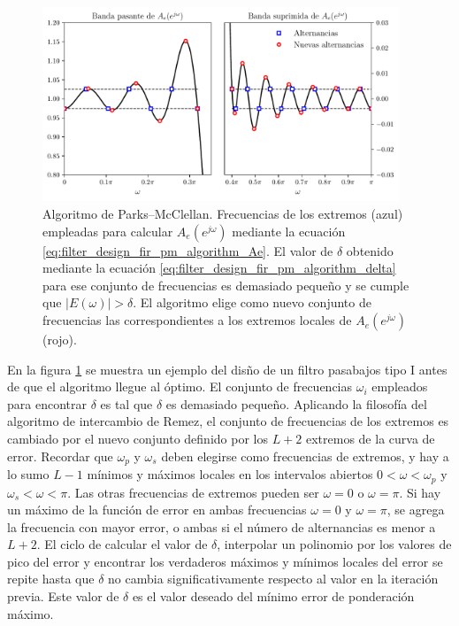 \documentclass[a4paper]{report}
\begin{document}
\begin{figure}[!htb]
 \begin{center}
 \includegraphics[width=0.95\textwidth]{figuras/filter_design_fir_optimal_pm_implementation_plots_Ae_iter_2.pdf}
 \caption{\label{fig:filter_design_fir_optimal_pm_implementation_plots_Ae_iter_2} Algoritmo de Parks--McClellan. Frecuencias de los extremos (azul) empleadas para calcular \(A_e(e^{j\omega})\) mediante la ecuación \ref{eq:filter_design_fir_pm_algorithm_Ae}. El valor de \(\delta\) obtenido mediante la ecuación \ref{eq:filter_design_fir_pm_algorithm_delta} para ese conjunto de frecuencias es demasiado pequeño y se cumple que \(|E(\omega)|>\delta\). El algoritmo elige como nuevo conjunto de frecuencias las correspondientes a los extremos locales de \(A_e(e^{j\omega})\) (rojo).}
 \end{center}
\end{figure}
En la figura \ref{fig:filter_design_fir_optimal_pm_implementation_plots_Ae_iter_2} se muestra un ejemplo del disño de un filtro pasabajos tipo I antes de que el algoritmo llegue al óptimo. El conjunto de frecuencias \(\omega_i\) empleados para encontrar \(\delta\) es tal que \(\delta\) es demasiado pequeño. Aplicando la filosofía del algoritmo de intercambio de Remez, el conjunto de frecuencias de los extremos es cambiado por el nuevo conjunto definido por los \(L+2\) extremos de la curva de error. Recordar que \(\omega_p\) y \(\omega_s\) deben elegirse como frecuencias de extremos, y hay a lo sumo \(L-1\) mínimos y máximos locales en los intervalos abiertos \(0<\omega<\omega_p\) y \(\omega_s<\omega<\pi\). Las otras frecuencias de extremos pueden ser \(\omega=0\) o \(\omega=\pi\). Si hay un máximo de la función de error en ambas frecuencias \(\omega=0\) y \(\omega=\pi\), se agrega la frecuencia con mayor error, o ambas si el número de alternancias es menor a \(L+2\). El ciclo de calcular el valor de \(\delta\), interpolar un polinomio por los valores de pico del error y encontrar los verdaderos máximos y mínimos locales del error se repite hasta que \(\delta\) no cambia significativamente respecto al valor en la iteración previa. Este valor de \(\delta\) es el valor deseado del mínimo error de ponderación máximo.
\end{document}
